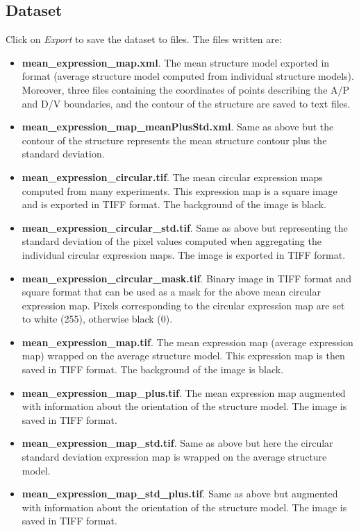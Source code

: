 \subsection{Dataset}
Click on \textit{Export} to save the dataset to files. The files written are:

\begin{itemize}
 \item \textbf{mean\_expression\_map.xml}. The mean structure model exported in \wingj format (average structure model computed from individual structure models). Moreover, three files containing the coordinates of points describing the A/P and D/V boundaries, and the contour of the structure are saved to text files.
 \item \textbf{mean\_expression\_map\_meanPlusStd.xml}. Same as above but the contour of the structure represents the mean structure contour plus the standard deviation.
 \item \textbf{mean\_expression\_circular.tif}. The mean circular expression maps computed from many experiments. This expression map is a square image and is exported in TIFF format. The background of the image is black.
 \item \textbf{mean\_expression\_circular\_std.tif}. Same as above but representing the standard deviation of the pixel values computed when aggregating the individual circular expression maps. The image is exported in TIFF format.
 \item \textbf{mean\_expression\_circular\_mask.tif}. Binary image in TIFF format and square format that can be used as a mask for the above mean circular expression map. Pixels corresponding to the circular expression map are set to white (255), otherwise black (0).
 \item \textbf{mean\_expression\_map.tif}. The mean expression map (average expression map) wrapped on the average structure model. This expression map is then saved in TIFF format. The background of the image is black.
 \item \textbf{mean\_expression\_map\_plus.tif}. The mean expression map augmented with information about the orientation of the structure model. The image is saved in TIFF format.
 \item \textbf{mean\_expression\_map\_std.tif}. Same as above but here the circular standard deviation expression map is wrapped on the average structure model.
 \item \textbf{mean\_expression\_map\_std\_plus.tif}. Same as above but augmented with information about the orientation of the structure model. The image is saved in TIFF format.

\end{itemize}
